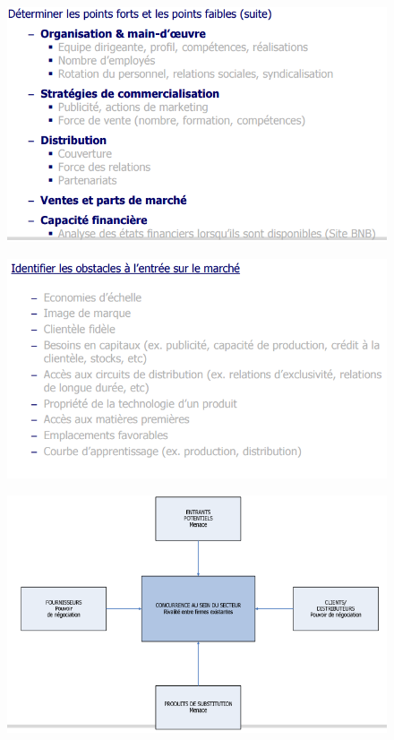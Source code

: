 \documentclass{article}
\begin{document}
\begin{figure}[H]
	\centering
	\includegraphics[width=14cm]{etudeConcurrence4.png}
\end{figure}
\begin{figure}[H]
	\centering
	\includegraphics[width=14cm]{etudeConcurrence5.png}
\end{figure}
\begin{figure}[H]
	\centering
	\includegraphics[width=14cm]{etudeConcurrence6.png}
\end{figure}
\end{document}
